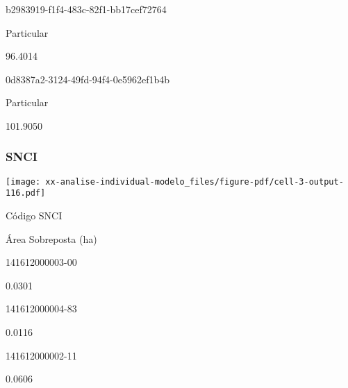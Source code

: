 \documentclass[
  11pt,
  a4paper,
  DIV=11,
  numbers=noendperiod]{scrartcl}
\begin{document}
\n      

b2983919-f1f4-483c-82f1-bb17cef72764

\n      

Particular

\n      

96.4014

\n    

\n    

\n      

0d8387a2-3124-49fd-94f4-0e5962ef1b4b

\n      

Particular

\n      

101.9050

\n    

\n  

\n

\subsubsection{SNCI}\label{snci-5}

\texttt{[image: xx-analise-individual-modelo\_files/figure-pdf/cell-3-output-116.pdf]}

\n  

\n    

\n      

Código SNCI

\n      

Área Sobreposta (ha)

\n    

\n  

\n  

\n    

\n      

141612000003-00

\n      

0.0301

\n    

\n    

\n      

141612000004-83

\n      

0.0116

\n    

\n    

\n      

141612000002-11

\n      

0.0606

\n    

\n  

\n
\end{document}
